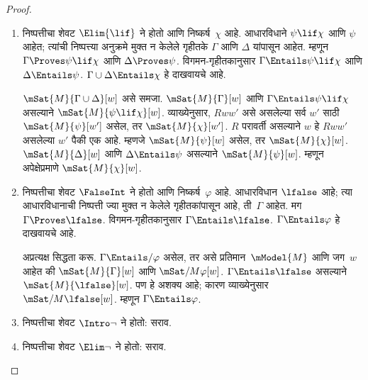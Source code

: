 \begin{proof}
\begin{enumerate}
    $\mSat{M}{\Gamma}[w]$ असे समजा.
    $Rww'$ असे असलेल्या सर्व $w'$ साठी
    $\mSat{M}{\psi}[w']$ असेल, तर
    $\mSat{M}{\chi}[w']$, हे दाखवायचे आहे.
    म्हणून $Rww'$ आणि $\mSat{M}{\psi}[w']$
    असे गृहीत धरा.
    \ref{int:sem:rel:prop:true-monotonic} नुसार
    $\mSat{M}{\Gamma}[w']$.
    $\Gamma \cup \{\psi\} \Entails \chi$
    असल्याने $\mSat{M}{\chi}[w']$,
    हेच दाखवायचे होते.

  \item निष्पत्तीचा शेवट $\Elim{\lif}$ ने होतो
    आणि निष्कर्ष~$\chi$ आहे. आधारविधाने
    $\psi \lif \chi$ आणि $\psi$ आहेत;
    त्यांची निष्पत्त्या अनुक्रमे
    मुक्त न केलेले गृहीतके $\Gamma$ आणि
    $\Delta$ यांपासून आहेत. म्हणून
    $\Gamma \Proves \psi \lif \chi$ आणि
    $\Delta \Proves \psi$.
    विगमन-गृहीतकानुसार
    $\Gamma \Entails \psi \lif \chi$
    आणि $\Delta \Entails \psi$.
    $\Gamma \cup \Delta \Entails \chi$
    हे दाखवायचे आहे.

    $\mSat{M}{\Gamma \cup \Delta}[w]$ असे समजा.
    $\mSat{M}{\Gamma}[w]$ आणि
    $\Gamma \Entails \psi \lif \chi$ असल्याने
    $\mSat{M}{\psi \lif \chi}[w]$.
    व्याख्येनुसार, $Rww'$ असे असलेल्या
    सर्व $w'$ साठी $\mSat{M}{\psi}[w']$
    असेल, तर $\mSat{M}{\chi}[w']$.
    $R$ परावर्ती असल्याने $w$ हे
    $Rww'$ असलेल्या $w'$ पैकी एक आहे.
    म्हणजे $\mSat{M}{\psi}[w]$ असेल,
    तर $\mSat{M}{\chi}[w]$.
    $\mSat{M}{\Delta}[w]$ आणि
    $\Delta \Entails \psi$ असल्याने
    $\mSat{M}{\psi}[w]$. म्हणून
    अपेक्षेप्रमाणे $\mSat{M}{\chi}[w]$.

  \item निष्पत्तीचा शेवट $\FalseInt$ ने होतो
    आणि निष्कर्ष~$\varphi$ आहे. आधारविधान
    $\lfalse$ आहे; त्या आधारविधानाची
    निष्पत्ती ज्या
    मुक्त न केलेले गृहीतकांपासून आहे,
    ती~$\Gamma$ आहेत. मग
    $\Gamma \Proves \lfalse$.
    विगमन-गृहीतकानुसार
    $\Gamma \Entails \lfalse$.
    $\Gamma \Entails \varphi$ हे दाखवायचे आहे.

    अप्रत्यक्ष सिद्धता करू.
    $\Gamma \Entails/ \varphi$ असेल, तर
    असे प्रतिमान~$\mModel{M}$ आणि जग~$w$
    आहेत की $\mSat{M}{\Gamma}[w]$
    आणि $\mSat/{M}{\varphi}[w]$.
    $\Gamma \Entails \lfalse$
    असल्याने $\mSat{M}{\lfalse}[w]$.
    पण हे अशक्य आहे; कारण व्याख्येनुसार
    $\mSat/{M}{\lfalse}[w]$.
    म्हणून $\Gamma \Entails \varphi$.
  \item निष्पत्तीचा शेवट $\Intro\lnot$ ने होतो: सराव.
  \item निष्पत्तीचा शेवट $\Elim\lnot$ ने होतो: सराव.
  \end{enumerate}
\end{proof}

